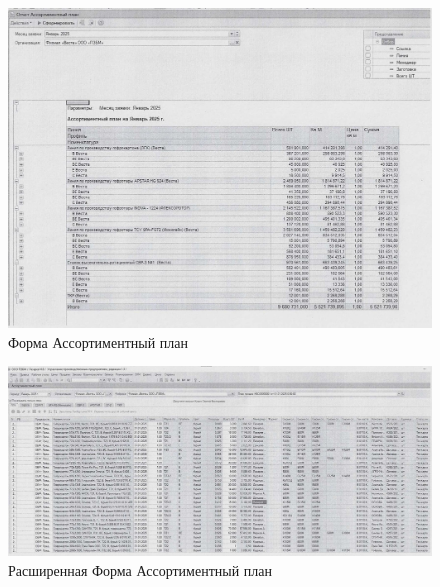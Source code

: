 \begin{figure}
\begin{center}
\includegraphics[height=0.5\textheight, width=1.3\textwidth, keepaspectratio]{Pics/I.5.6..jpg}
\end{center}
\caption{Форма Ассортиментный план}
\label{pic:I.5.6..jpg}
\end{figure}
\clearpage

\begin{figure}
\begin{center}
\includegraphics[height=0.3\textheight, width=1.3\textwidth, angle=90, keepaspectratio]{Pics/I.5.6.jpg}
\end{center}
\caption{Расширенная Форма Ассортиментный план}
\label{pic:I.5.6.jpg}
\end{figure}
\clearpage

